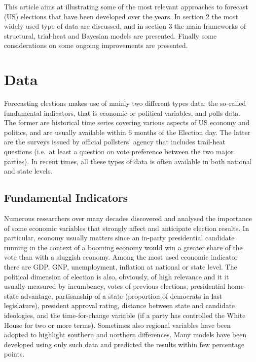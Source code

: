 \documentclass[
  12pt]{article}
\begin{document}
This article aims at illustrating some of the most relevant approaches
to forecast (US) elections that have been developed over the years. In
section 2 the most widely used type of data are discussed, and in
section 3 the main frameworks of structural, trial-heat and Bayesian
models are presented. Finally some considerations on some ongoing
improvements are presented.

\hypertarget{sec-data}{%
\section{Data}\label{sec-data}}

Forecasting elections makes use of mainly two different types data: the
so-called fundamental indicators, that is economic or political
variables, and polls data. The former are historical time series
covering various aspects of US economy and politics, and are usually
available within 6 months of the Election day. The latter are the
surveys issued by official pollsters' agency that includes trail-heat
questions (i.e.~at least a question on vote preference between the two
major parties). In recent times, all these types of data is often
available in both national and state levels.

\hypertarget{fundamental-indicators}{%
\subsection{Fundamental Indicators}\label{fundamental-indicators}}

Numerous researchers over many decades discovered and analysed the
importance of some economic variables that strongly affect and
anticipate election results. In particular, economy usually matters
since an in-party presidential candidate running in the context of a
booming economy would win a greater share of the vote than with a
sluggish economy. Among the most used economic indicator there are GDP,
GNP, unemployment, inflation at national or state level. The political
dimension of election is also, obviously, of high relevance and it it
usually measured by incumbency, votes of previous elections,
presidential home-state advantage, partisanship of a state (proportion
of democrats in last legislature), president approval rating, distance
between state and candidate ideologies, and the time-for-change variable
(if a party has controlled the White House for two or more terms).
Sometimes also regional variables have been adopted to highlight
southern and northern differences. Many models have been developed using
only such data and predicted the results within few percentage points.
\end{document}
